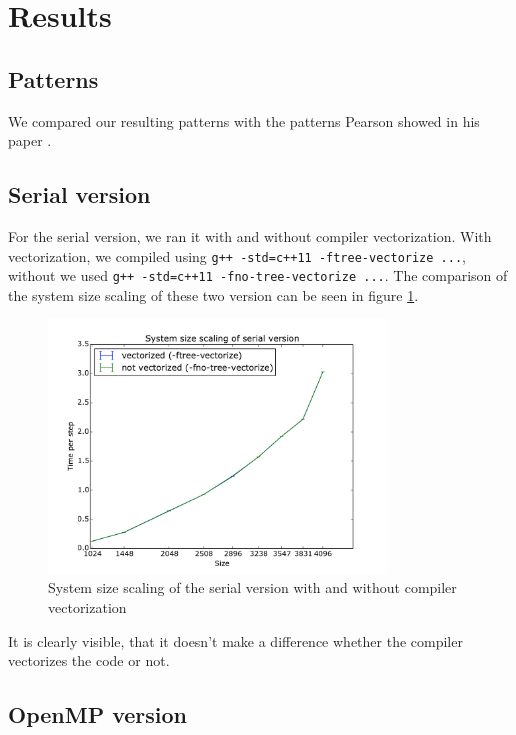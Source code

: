 \documentclass[a4paper]{article}
\begin{document}
\section{Results}

\subsection{Patterns}
We compared our resulting patterns with the patterns Pearson showed in his paper \cite{pearson_1993}.


\subsection{Serial version}
For the serial version, we ran it with and without compiler vectorization.
With vectorization, we compiled using \verb|g++ -std=c++11 -ftree-vectorize ...|, without we used \verb|g++ -std=c++11 -fno-tree-vectorize ...|.
The comparison of the system size scaling of these two version can be seen in figure \ref{fig:serial-vecnovec}.
\begin{figure}
	\centering
	\includegraphics[width=0.8\textwidth]{serial_vecnovec.pdf}
	\caption{System size scaling of the serial version with and without compiler vectorization}
	\label{fig:serial-vecnovec}
\end{figure}
It is clearly visible, that it doesn't make a difference whether the compiler vectorizes the code or not.

\subsection{OpenMP version}










\clearpage


\end{document}
